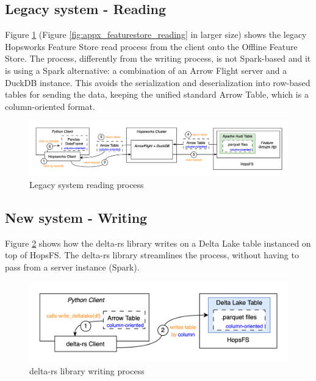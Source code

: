 \subsection{Legacy system - Reading}
\label{subsec:legacy_sys_reading}

Figure \ref{fig:featurestore_reading} (Figure \ref{fig:appx_featurestore_reading} in larger size) shows the legacy Hopsworks Feature Store read process from the client onto the Offline Feature Store. The process, differently from the writing process, is not Spark-based and it is using a Spark alternative: a combination of an Arrow Flight server and a DuckDB instance. This avoids the serialization and deserialization into row-based tables for sending the data, keeping the unified standard Arrow Table, which is a column-oriented format.

\begin{figure}
    \begin{center}
      \includegraphics[width=\textwidth]{figures/2-background/FeatureStore-reading.png}
    \end{center}
    \caption{Legacy system reading process}
    \label{fig:featurestore_reading}
\end{figure}

\subsection{New system - Writing}

Figure \ref{fig:delta_rs_writing} shows how the delta-rs library writes on a Delta Lake table instanced on top of \gls{HopsFS}. The delta-rs library streamlines the process, without having to pass from a server instance (Spark).

\begin{figure}
    \begin{center}
      \includegraphics[width=\textwidth]{figures/2-background/delta-rs_writing.png}
    \end{center}
    \caption{delta-rs library writing process}
    \label{fig:delta_rs_writing}
\end{figure}

